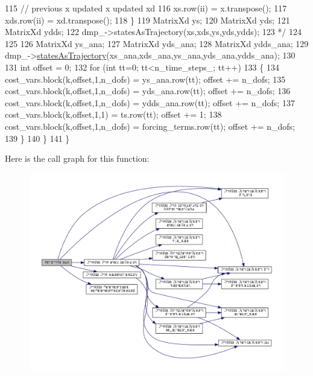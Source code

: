 \begin{DoxyCode}
115 \textcolor{comment}{      //                     previous x   updated x   updated xd}
116 \textcolor{comment}{      xs.row(ii)  = x.transpose();}
117 \textcolor{comment}{      xds.row(ii)  = xd.transpose();}
118 \textcolor{comment}{    \}}
119 \textcolor{comment}{    MatrixXd ys;}
120 \textcolor{comment}{    MatrixXd yds;}
121 \textcolor{comment}{    MatrixXd ydds;}
122 \textcolor{comment}{    dmp\_->statesAsTrajectory(xs,xds,ys,yds,ydds);}
123 \textcolor{comment}{    */}
124 
125     
126     MatrixXd ys\_ana;
127     MatrixXd yds\_ana;
128     MatrixXd ydds\_ana;
129     dmp\_->\hyperlink{classDmpBbo_1_1Dmp_aa3ad2fc66e8ce09cfa68032a4a5004b9}{statesAsTrajectory}(xs\_ana,xds\_ana,ys\_ana,yds\_ana,ydds\_ana);
130     
131     \textcolor{keywordtype}{int} offset = 0;
132     \textcolor{keywordflow}{for} (\textcolor{keywordtype}{int} tt=0; tt<n\_time\_steps\_; tt++)
133     \{
134       cost\_vars.block(k,offset,1,n\_dofs) = ys\_ana.row(tt);   offset += n\_dofs; 
135       cost\_vars.block(k,offset,1,n\_dofs) = yds\_ana.row(tt);  offset += n\_dofs; 
136       cost\_vars.block(k,offset,1,n\_dofs) = ydds\_ana.row(tt); offset += n\_dofs; 
137       cost\_vars.block(k,offset,1,1) = ts.row(tt);       offset += 1; 
138       cost\_vars.block(k,offset,1,n\_dofs) = forcing\_terms.row(tt); offset += n\_dofs;       
139     \}
140   \}
141 \}
\end{DoxyCode}


Here is the call graph for this function\+:
\nopagebreak
\begin{figure}[H]
\begin{center}
\leavevmode
\includegraphics[width=350pt]{classDmpBbo_1_1TaskSolverDmp_a1bfa5f861b08d1073a5c4461aefd7e57_cgraph}
\end{center}
\end{figure}


